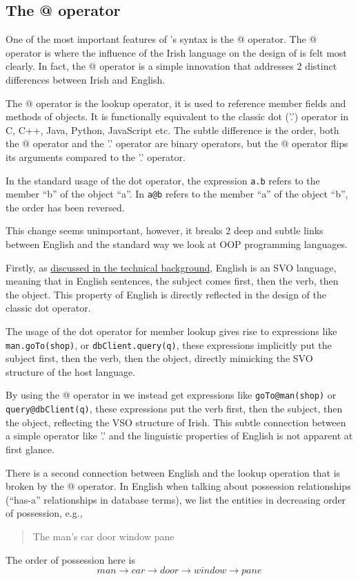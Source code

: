 \subsection{The @ operator}\label{atoperator}

One of the most important features of \Setanta{}'s syntax is the @ operator. The @ operator is where the influence of the Irish language on the design of \Setanta{} is felt most clearly. In fact, the @ operator is a simple innovation that addresses 2 distinct differences between Irish and English.

The @ operator is the lookup operator, it is used to reference member fields and methods of objects. It is functionally equivalent to the classic dot ('.') operator in C, C++, Java, Python, JavaScript etc. The subtle difference is the order, both the @ operator and the '.' operator are binary operators, but the @ operator flips its arguments compared to the '.' operator.

In the standard usage of the dot operator, the expression \verb|a.b| refers to the member ``b'' of the object ``a''. In \Setanta{} \verb|a@b| refers to the member ``a'' of the object ``b'', the order has been reversed.

This change seems unimportant, however, it breaks 2 deep and subtle links between English and the standard way we look at OOP programming languages.

Firstly, as \hyperref[background:vsosvo]{discussed in the technical background}, English is an SVO language, meaning that in English sentences, the subject comes first, then the verb, then the object. This property of English is directly reflected in the design of the classic dot operator.

The usage of the dot operator for member lookup gives rise to expressions like \verb|man.goTo(shop)|, or \verb|dbClient.query(q)|, these expressions implicitly put the subject first, then the verb, then the object, directly mimicking the SVO structure of the host language.

By using the @ operator in \Setanta{} we instead get expressions like \verb|goTo@man(shop)| or\\
\verb|query@dbClient(q)|, these expressions put the verb first, then the subject, then the object, reflecting the VSO structure of Irish. This subtle connection between a simple operator like '.' and the linguistic properties of English is not apparent at first glance.

There is a second connection between English and the lookup operation that is broken by the @ operator. In English when talking about possession relationships (``has-a'' relationships in database terms), we list the entities in decreasing order of possession, e.g.,
\begin{quote}
    The man's car door window pane
\end{quote}
The order of possession here is
\[man \rightarrow car \rightarrow door \rightarrow window \rightarrow pane\]

